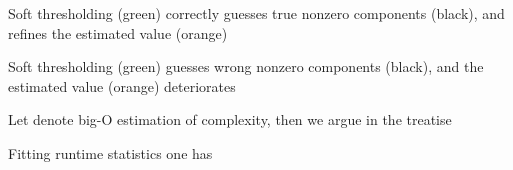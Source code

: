 {
\blank [big]

\I Soft thresholding (green) correctly guesses true nonzero components (black), and refines the estimated value (orange)
}
{
\blank [big]

\I Soft thresholding (green) guesses wrong nonzero components (black), and the estimated value (orange) deteriorates
}
{
\I Let  denote big-O estimation of complexity, then we argue in the treatise

\I Fitting runtime statistics one has
}


